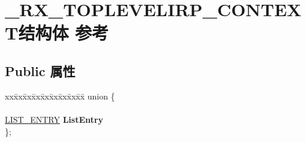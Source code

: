 \hypertarget{struct___r_x___t_o_p_l_e_v_e_l_i_r_p___c_o_n_t_e_x_t}{}\section{\+\_\+\+R\+X\+\_\+\+T\+O\+P\+L\+E\+V\+E\+L\+I\+R\+P\+\_\+\+C\+O\+N\+T\+E\+X\+T结构体 参考}
\label{struct___r_x___t_o_p_l_e_v_e_l_i_r_p___c_o_n_t_e_x_t}
\subsection*{Public 属性}
\begin{DoxyCompactItemize}
\item 
\mbox{\label{struct___r_x___t_o_p_l_e_v_e_l_i_r_p___c_o_n_t_e_x_t_a1b576ceaf40911689663a0bd1d970942}} 
\begin{tabbing}
xx\=xx\=xx\=xx\=xx\=xx\=xx\=xx\=xx\=\kill
union \{\\
\\
\>\hyperlink{struct___l_i_s_t___e_n_t_r_y}{LIST\_ENTRY} {\bfseries ListEntry}\\
\}; \\


\end{tabbing}
\end{DoxyCompactItemize}

